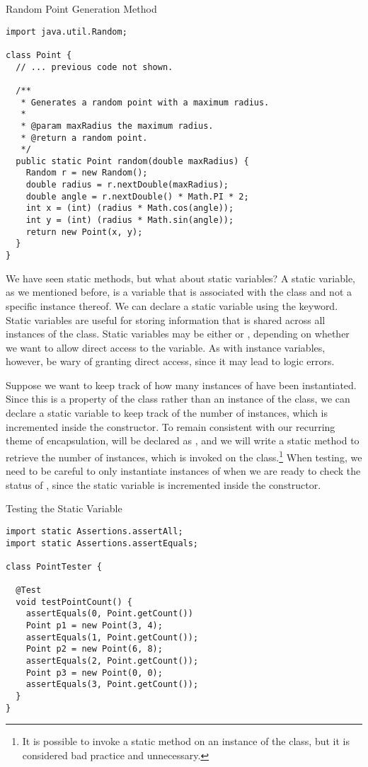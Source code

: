 \begin{cl}{Random Point Generation Method}
\begin{lstlisting}[language=MyJava]
import java.util.Random;

class Point {
  // ... previous code not shown.

  /**
   * Generates a random point with a maximum radius.
   *
   * @param maxRadius the maximum radius.
   * @return a random point.
   */
  public static Point random(double maxRadius) {
    Random r = new Random();
    double radius = r.nextDouble(maxRadius);
    double angle = r.nextDouble() * Math.PI * 2;
    int x = (int) (radius * Math.cos(angle));
    int y = (int) (radius * Math.sin(angle));
    return new Point(x, y);
  }
}
\end{lstlisting}
\end{cl}

We have seen static methods, but what about static variables? A static variable, as we mentioned before, is a variable that is associated with the class and not a specific instance thereof. We can declare a static variable using the  keyword. Static variables are useful for storing information that is shared across all instances of the class. Static variables may be either  or , depending on whether we want to allow direct access to the variable. As with instance variables, however, be wary of granting direct access, since it may lead to logic errors.

\example Suppose we want to keep track of how many instances of  have been instantiated. Since this is a property of the  class rather than an instance of the class, we can declare a static variable  to keep track of the number of instances, which is incremented inside the constructor. To remain consistent with our recurring theme of encapsulation,  will be declared as , and we will write a static method  to retrieve the number of instances, which is invoked on the class.\footnote{It is possible to invoke a static method on an instance of the class, but it is considered bad practice and unnecessary.} When testing, we need to be careful to only instantiate instances of  when we are ready to check the status of , since the static  variable is incremented inside the constructor.

\begin{cl}[PointTester]{Testing the  Static Variable}
\begin{lstlisting}[language=MyJava]
import static Assertions.assertAll;
import static Assertions.assertEquals;

class PointTester {

  @Test
  void testPointCount() {
    assertEquals(0, Point.getCount())
    Point p1 = new Point(3, 4);
    assertEquals(1, Point.getCount());
    Point p2 = new Point(6, 8);
    assertEquals(2, Point.getCount());
    Point p3 = new Point(0, 0);
    assertEquals(3, Point.getCount());
  }
}
\end{lstlisting}
\end{cl}

